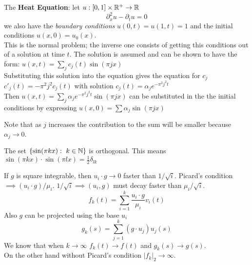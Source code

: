 The \textbf{Heat Equation}: let $u:[0,1]\times \mathbb{R}^+ \to \mathbb{R}$ 
$$ \partial_x^2 u - \partial_t u = 0$$
we also have the \emph{boundary conditions} $u(0,t)=u(1,t)=1$ and the initial conditions $u(x,0)=u_0(x)$.\\
This is the normal problem; the inverse one consists of getting this conditions out of a solution at time $t$. The solution is assumed and can be shown to have the form: $u(x,t)=\sum_j c_j(t)\sin(\pi j x)$\\
Substituting this solution into the equation gives the equation for $c_j$ $c'_j(t)=-\pi^2 j^2 c_j(t)$ with solution $c_j(t) = \alpha_j e^{-\pi^2j^2 t}$ \\
Then $u(x,t)=\sum_j \alpha_j e^{-\pi^2j^2 t} \sin(\pi j x)$ can be substituted in the the initial conditions by expressing $u(x,0)=\sum \alpha_j \sin(\pi j x)$
\begin{remarks}
Note that as $j $ increases the contribution to the sum will be smaller because $\alpha_j\to 0$.
\end{remarks}

The set $\{\sin(\pi k x): \ k\in \mathbb{N} \}$ is orthogonal. This means $\sin(\pi k x)\cdot \sin(\pi l x)= \frac{1}{2}\delta_{lk}$ 

If $g$ is square integrable, then $u_i\cdot g \to 0$ faster than $1/\sqrt{i}$. Picard's condition $\implies (u_i\cdot g)/\mu_i$. $1/\sqrt{i}\implies (u_i,g)$ must decay faster than $\mu_i/\sqrt{i}$. 
$$f_k(t) = \sum_{i=1}^k \frac{u_i\cdot g}{\mu_i} v_i(t)$$   
Also $g$ can be projected using the base $u_i$
$$g_k(s) = \sum_{j=1}^k (g\cdot u_j)u_j(s)$$
We know that when $k\to \infty$ $f_k(t)\to f(t)$ and $g_k(s)\to g(s)$.\\
On the other hand without Picard's condition $|f_k|_2\to \infty$.
